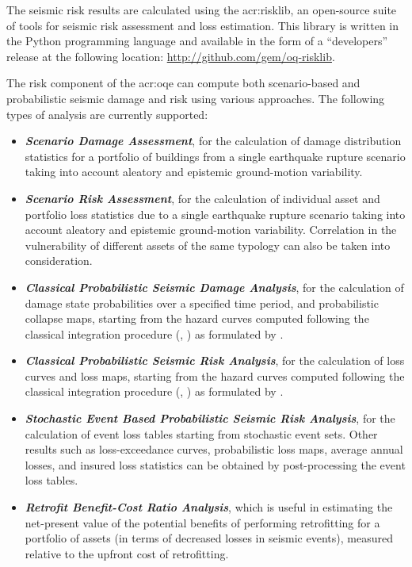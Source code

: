
The seismic risk results are calculated using the \gls{acr:risklib}, 
an open-source suite of tools for seismic risk assessment and
loss estimation. This library is written in the Python programming language
and available in the form of a ``developers'' release at the following location:
\href{http://github.com/gem/oq-risklib}{http://github.com/gem/oq-risklib}.

The risk component of the \glsdesc{acr:oqe} can compute both scenario-based and
probabilistic seismic damage and risk using various approaches. The following
types of analysis are currently supported:

\begin{itemize}

    \item \textit{\textbf{Scenario Damage Assessment}}, for the
	calculation of damage distribution statistics for a portfolio of buildings
	from a single earthquake rupture scenario taking into account aleatory and
	epistemic ground-motion variability.

    \item \textit{\textbf{Scenario Risk Assessment}}, for the calculation of
	individual asset and portfolio loss statistics due to a single earthquake
	rupture scenario taking into account aleatory and epistemic ground-motion
	variability. Correlation in the vulnerability of different assets of the
	same typology can also be taken into consideration.

	\item \textit{\textbf{Classical Probabilistic Seismic Damage Analysis}}, for 
	the calculation of damage state probabilities over a specified time period,  
	and probabilistic collapse maps, starting from the hazard curves 
	computed following the classical integration procedure (\cite{cornell1968}, 
	\citet{mcguire1976}) as formulated by \cite{field2003}.

    \item \textit{\textbf{Classical Probabilistic Seismic Risk Analysis}}, for the
	calculation of loss curves and loss maps, starting from the hazard curves 
	computed following the classical integration procedure (\cite{cornell1968}, 
	\citet{mcguire1976}) as formulated by \cite{field2003}.

	\item \textit{\textbf{Stochastic Event Based Probabilistic Seismic Risk Analysis}}, 
	for the calculation of event loss tables starting from stochastic event sets.
	Other results such as loss-exceedance curves, probabilistic loss maps, 
	average annual losses, and insured loss statistics can be obtained by 
	post-processing the event loss tables.

    \item \textit{\textbf{Retrofit Benefit-Cost Ratio Analysis}}, which is
	useful in estimating the net-present value of the potential benefits of
	performing retrofitting for a portfolio of assets (in terms of decreased
	losses in seismic events), measured relative to the upfront cost of
	retrofitting.

\end{itemize}

